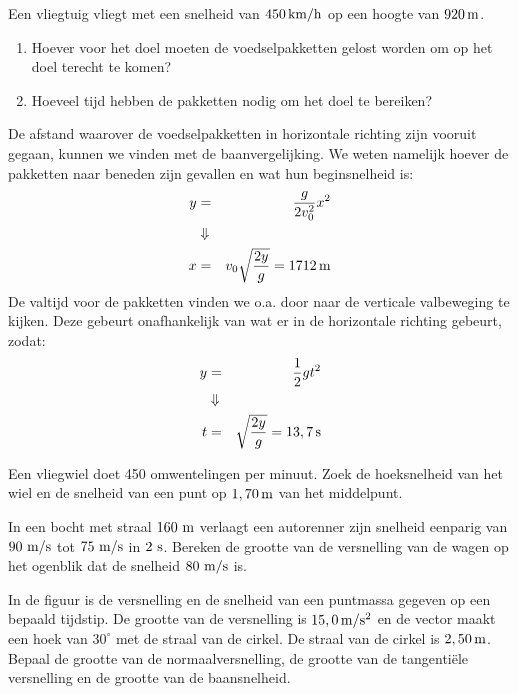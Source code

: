 \documentclass{ximera}
\begin{document}
\begin{exercise}
	Een vliegtuig vliegt met een snelheid van $450\rm\,km/h$ op een hoogte van $920\rm\,m$.
\begin{enumerate}
\item Hoever voor het doel moeten de voedselpakketten gelost worden om op het doel terecht te komen?
\item Hoeveel tijd hebben de pakketten nodig om het doel te bereiken?
\end{enumerate}
\begin{oplossing}


De afstand waarover de voedselpakketten in horizontale richting zijn vooruit gegaan, kunnen we vinden met de
baanvergelijking. We weten namelijk hoever de pakketten naar beneden zijn gevallen en wat hun beginsnelheid is:
\begin{eqnarray*}
y&=&\frac{g}{2v_0^2}x^2\\
&\Downarrow&\\
x&=&v_0\sqrt{\frac{2y}{g}}=1712\rm\,m
\end{eqnarray*}
De valtijd voor de pakketten vinden we o.a. door naar de verticale
valbeweging te kijken. Deze gebeurt onafhankelijk van wat er in de
horizontale richting gebeurt, zodat:
\begin{eqnarray*}
y&=&\frac{1}{2}gt^2\\
&\Downarrow&\\
t&=&\sqrt{\frac{2y}{g}}=13,7\rm\,s
\end{eqnarray*}
\end{oplossing}
\end{exercise}

\begin{exercise}
	Een vliegwiel doet 450 omwentelingen per minuut. Zoek de hoeksnelheid van het wiel en de snelheid van een punt op $1,70\rm\,m$ van het middelpunt.
\end{exercise}

\begin{exercise}
	In een bocht met straal $160~\rm m$ verlaagt een autorenner zijn snelheid eenparig van $90~\rm m/s$ tot $75~\rm m/s$ in $2~\rm s$. Bereken de grootte van de versnelling van de wagen op het ogenblik dat de snelheid $80~\rm m/s$ is.
\begin{multipleChoice}
\end{multipleChoice}
\end{exercise}

\begin{exercise} 
	In de figuur is de versnelling en de snelheid van een puntmassa gegeven op een bepaald tijdstip. De grootte van de versnelling is $15,0\rm\,m/s^2$ en de vector maakt een hoek van $30^\circ$ met de straal van de cirkel. De straal van de cirkel is $2,50\rm\,m$. Bepaal de grootte van de normaalversnelling, de grootte van de tangentiële versnelling en de grootte van de baansnelheid.
\end{exercise}
\end{document}
